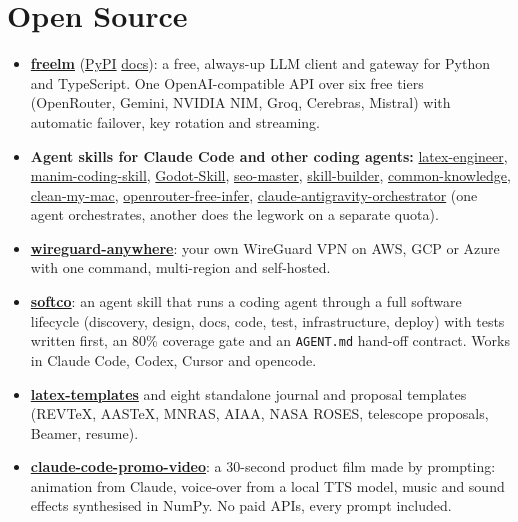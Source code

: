 \documentclass[10pt,a4paper]{article}
\newcommand{\lnk}[2]{\href{#1}{\color{accent}#2}}
\newcommand{\sep}{\unskip\enspace{\color{muted}\textbar}\enspace\ignorespaces}
\begin{document}
\section{Open Source}
\begin{itemize}
  \item \lnk{https://github.com/shihabshahrier/freelm}{\textbf{freelm}}
        (\lnk{https://pypi.org/project/freelm/}{PyPI} \sep \lnk{https://shihub.site/freelm}{docs}):
        a free, always-up LLM client and gateway for Python and TypeScript. One OpenAI-compatible API over six free tiers
        (OpenRouter, Gemini, NVIDIA NIM, Groq, Cerebras, Mistral) with automatic failover, key rotation and streaming.
  \item \textbf{Agent skills for Claude Code and other coding agents:}
        \lnk{https://github.com/shihabshahrier/latex-engineer}{latex-engineer},
        \lnk{https://github.com/shihabshahrier/manim-coding-skill}{manim-coding-skill},
        \lnk{https://github.com/shihabshahrier/Godot-Skill}{Godot-Skill},
        \lnk{https://github.com/shihabshahrier/seo-master-skill}{seo-master},
        \lnk{https://github.com/shihabshahrier/skill-builder}{skill-builder},
        \lnk{https://github.com/shihabshahrier/common-knowledge}{common-knowledge},
        \lnk{https://github.com/shihabshahrier/clean-my-mac}{clean-my-mac},
        \lnk{https://github.com/shihabshahrier/openrouter-free-infer}{openrouter-free-infer},
        \lnk{https://github.com/shihabshahrier/claude-antigravity-orchestrator}{claude-antigravity-orchestrator}
        (one agent orchestrates, another does the legwork on a separate quota).
  \item \lnk{https://github.com/shihabshahrier/wireguard-anywhere}{\textbf{wireguard-anywhere}}: your own WireGuard VPN on
        AWS, GCP or Azure with one command, multi-region and self-hosted.
  \item \lnk{https://github.com/shihabshahrier/softco}{\textbf{softco}}: an agent skill that runs a coding agent through a
        full software lifecycle (discovery, design, docs, code, test, infrastructure, deploy) with tests written first, an
        80\% coverage gate and an \texttt{AGENT.md} hand-off contract. Works in Claude Code, Codex, Cursor and opencode.
  \item \lnk{https://github.com/Shahriar-Labs/latex-templates}{\textbf{latex-templates}} and eight standalone journal and
        proposal templates (REVTeX, AASTeX, MNRAS, AIAA, NASA ROSES, telescope proposals, Beamer, resume).
  \item \lnk{https://github.com/shihabshahrier/claude-code-promo-video}{\textbf{claude-code-promo-video}}: a 30-second
        product film made by prompting: animation from Claude, voice-over from a local TTS model, music and sound effects
        synthesised in NumPy. No paid APIs, every prompt included.
\end{itemize}
\end{document}
